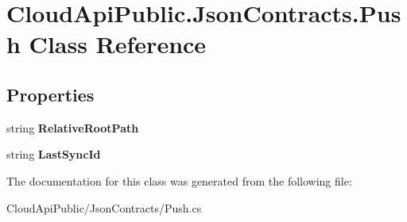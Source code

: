 \hypertarget{class_cloud_api_public_1_1_json_contracts_1_1_push}{\section{Cloud\-Api\-Public.\-Json\-Contracts.\-Push Class Reference}
\label{class_cloud_api_public_1_1_json_contracts_1_1_push}
}
\subsection*{Properties}
\begin{DoxyCompactItemize}
\item 
\hypertarget{class_cloud_api_public_1_1_json_contracts_1_1_push_a31731207c67d351e0c1469e7d18cedf3}{string {\bfseries Relative\-Root\-Path}}\label{class_cloud_api_public_1_1_json_contracts_1_1_push_a31731207c67d351e0c1469e7d18cedf3}

\item 
\hypertarget{class_cloud_api_public_1_1_json_contracts_1_1_push_a3dbd61ad7aed156fc82dad9b9e2dd593}{string {\bfseries Last\-Sync\-Id}}\label{class_cloud_api_public_1_1_json_contracts_1_1_push_a3dbd61ad7aed156fc82dad9b9e2dd593}

\end{DoxyCompactItemize}


The documentation for this class was generated from the following file\-:\begin{DoxyCompactItemize}
\item 
Cloud\-Api\-Public/\-Json\-Contracts/Push.\-cs\end{DoxyCompactItemize}

